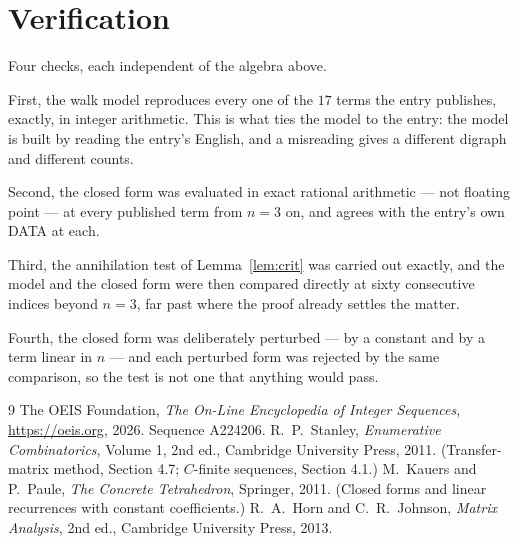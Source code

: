 \documentclass[11pt,a4paper]{article}
\theoremstyle{plain}
\theoremstyle{definition}
\begin{document}
\section{Verification}

Four checks, each independent of the algebra above.

First, the walk model reproduces every one of the $17$ terms the entry publishes,
exactly, in integer arithmetic. This is what ties the model to the entry: the model is built
by reading the entry's English, and a misreading gives a different digraph and different
counts.

Second, the closed form was evaluated in exact rational arithmetic --- not floating point ---
at every published term from $n=3$ on, and agrees with the entry's own DATA at each.

Third, the annihilation test of Lemma~\ref{lem:crit} was carried out exactly, and the model
and the closed form were then compared directly at sixty consecutive indices beyond
$n=3$, far past where the proof already settles the matter.

Fourth, the closed form was deliberately perturbed --- by a constant and by a term linear in
$n$ --- and each perturbed form was rejected by the same comparison, so the test is not one
that anything would pass.

\begin{thebibliography}{9}
 The OEIS Foundation, \emph{The On-Line Encyclopedia of Integer
Sequences}, \url{https://oeis.org}, 2026. Sequence A224206.
 R.~P.~Stanley, \emph{Enumerative Combinatorics}, Volume 1, 2nd ed.,
Cambridge University Press, 2011. (Transfer-matrix method, Section 4.7; $C$-finite sequences,
Section 4.1.)
 M.~Kauers and P.~Paule, \emph{The Concrete Tetrahedron}, Springer, 2011.
(Closed forms and linear recurrences with constant coefficients.)
 R.~A.~Horn and C.~R.~Johnson, \emph{Matrix Analysis}, 2nd ed., Cambridge
University Press, 2013.
\end{thebibliography}
\end{document}
